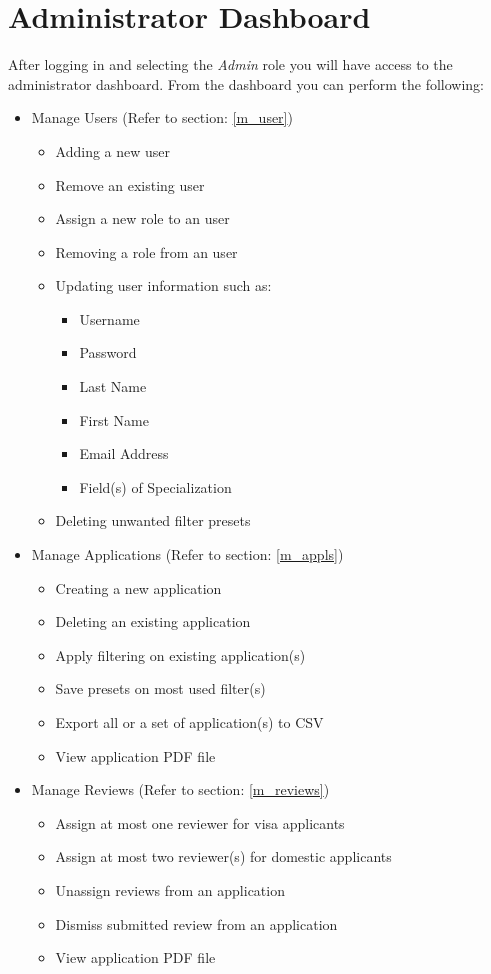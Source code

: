 \documentclass[fontsize=12pt,paper=letter,twoside]{scrartcl}
\begin{document}
\clearpage
\section{Administrator Dashboard}

After logging in and selecting the \emph{Admin} role you will have access to the administrator dashboard. From the dashboard you can perform the following:
\begin{itemize}
\item Manage Users (Refer to section: \ref{m_user})
\begin{itemize}
\item Adding a new user
\item Remove an existing user
\item Assign a new role to an user
\item Removing a role from an user
\item Updating user information such as:
\begin{itemize}
\item Username
\item Password
\item Last Name
\item First Name
\item Email Address
\item Field(s) of Specialization
\end{itemize}
\item Deleting unwanted filter presets
\end{itemize}
\item Manage Applications (Refer to section: \ref{m_appls})
\begin{itemize}
\item Creating a new application
\item Deleting an existing application
\item Apply filtering on existing application(s)
\item Save presets on most used filter(s)
\item Export all or a set of application(s) to CSV
\item View application PDF file
\end{itemize}
\item Manage Reviews (Refer to section: \ref{m_reviews})
\begin{itemize}
\item Assign at most one reviewer for visa applicants
\item Assign at most two reviewer(s) for domestic applicants
\item Unassign reviews from an application
\item Dismiss submitted review from an application
\item View application PDF file
\end{itemize}
\end{itemize} 
\end{document}
